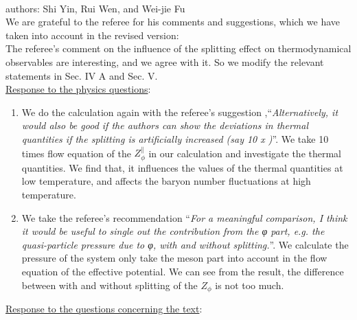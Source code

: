 \documentclass[aps,article,author-year,notitlepage,showpacs]{revtex4-1}
\begin{document}
 

\large

\\

\noindent authors: Shi Yin, Rui Wen, and Wei-jie Fu\\

\noindent We are grateful to the referee for his comments and suggestions, which we have taken into account in the revised version:\\[0.3ex] 

The referee's comment on the influence of the splitting effect on thermodynamical observables are interesting, and we agree with it. So we modify the relevant statements in Sec. IV A and Sec. V.\\[0.3ex] 

\noindent \underline{Response to the physics questions}:\\

\begin{enumerate}[1.]

\item We do the calculation again with the referee's suggestion ,``{\it Alternatively, it would also be good if the authors can show the deviations in thermal quantities if the splitting is artificially increased (say 10 x )}''. We take 10 times flow equation of the $Z^\|_\phi$ in our calculation and investigate the thermal quantities. We find that, it influences the values of the thermal quantities at low temperature, and affects the baryon number fluctuations at high temperature.\\[0.3ex] 

\item We take the referee's recommendation ``{\it For a meaningful comparison, I think it would be useful to single out the contribution from the φ part, e.g. the quasi-particle pressure due to φ, with and without splitting.}''. We calculate the pressure of the system only take the meson part into account in the flow equation of the effective potential. We can see from the result, the difference between with and without splitting of the $Z_\phi$ is not too much.
\end{enumerate}


\noindent \underline{Response to the questions concerning the text}:\\
\end{document}
